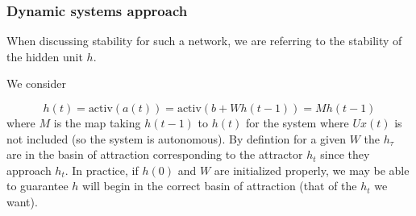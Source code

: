 \documentclass{beamer}
\begin{document}
\begin{frame}
  \frametitle{Dynamic systems approach}
  When discussing stability for such a network, we are referring to the stability of the hidden unit $h$.

    \vspace{0.5cm}

  We consider

\begin{equation*}
h(t) = \mbox{activ}(a(t)) = \mbox{activ}(b + W h(t-1)) = M h(t-1)
\end{equation*}
%
where $M$ is the map taking $h(t - 1)$ to $h(t)$ for the system where $Ux(t)$ is not included (so the system is autonomous). By defintion for a given $W$ the $h_\tau$ are in the basin of attraction corresponding to the attractor $h_t$ since they approach $h_t$. In practice, if $h(0)$ and $W$ are initialized properly, we may be able to guarantee $h$ will begin in the correct basin of attraction (that of the $h_t$ we want).

\end{frame}
\end{document}
